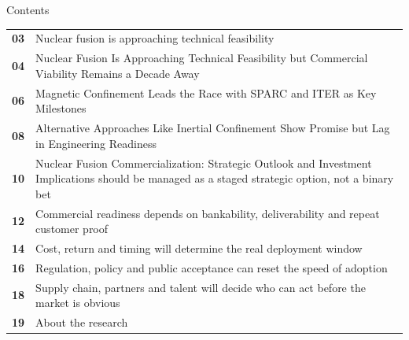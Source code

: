 \documentclass[10pt,a4paper]{article}
\begin{document}
\clearpage
{\sffamily\fontsize{26}{31}\selectfont\color{BONavy} Contents}\par\vspace{10pt}
\begin{tabularx}{\linewidth}{p{14mm}Y}
\textcolor{BOGreen}{\bfseries 03} & Nuclear fusion is approaching technical feasibility \\[5pt]
\textcolor{BOGreen}{\bfseries 04} & Nuclear Fusion Is Approaching Technical Feasibility but Commercial Viability Remains a Decade Away \\[5pt]
\textcolor{BOGreen}{\bfseries 06} & Magnetic Confinement Leads the Race with SPARC and ITER as Key Milestones \\[5pt]
\textcolor{BOGreen}{\bfseries 08} & Alternative Approaches Like Inertial Confinement Show Promise but Lag in Engineering Readiness \\[5pt]
\textcolor{BOGreen}{\bfseries 10} & Nuclear Fusion Commercialization: Strategic Outlook and Investment Implications should be managed as a staged strategic option, not a binary bet \\[5pt]
\textcolor{BOGreen}{\bfseries 12} & Commercial readiness depends on bankability, deliverability and repeat customer proof \\[5pt]
\textcolor{BOGreen}{\bfseries 14} & Cost, return and timing will determine the real deployment window \\[5pt]
\textcolor{BOGreen}{\bfseries 16} & Regulation, policy and public acceptance can reset the speed of adoption \\[5pt]
\textcolor{BOGreen}{\bfseries 18} & Supply chain, partners and talent will decide who can act before the market is obvious \\[5pt]
\textcolor{BOGreen}{\bfseries 19} & About the research \\[5pt]
\end{tabularx}
\clearpage
\end{document}
